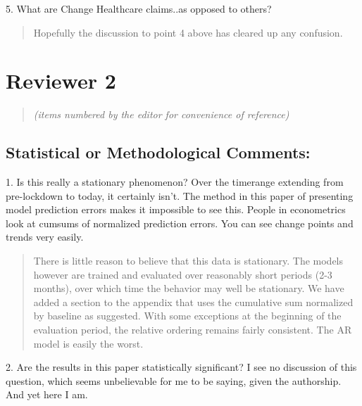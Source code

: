 \documentclass[11pt]{article}
\newenvironment{resp}{\begin{quote}\color{cobalt}}{\end{quote}}
\begin{document}
  5. What are Change Healthcare claims..as opposed to others?


\begin{resp}
  Hopefully the discussion to point 4 above has cleared up any confusion.
\end{resp}


\section*{Reviewer 2}
\begin{quote}
  \emph{(items numbered by the editor for convenience of reference)}
\end{quote}

\subsection*{Statistical or Methodological Comments:}
  
1. Is this really a stationary phenomenon? Over the timerange extending from
pre-lockdown to today, it certainly isn't. The method in this paper of
presenting model prediction errors makes it impossible to see this. People in
econometrics look at cumsums of normalized prediction errors. You can see change
points and trends very easily.

\begin{resp}
  There is little reason to believe that this data is stationary. The models
  however are trained and evaluated over reasonably short periods (2-3 months),
  over which time the behavior may well be stationary. We have added a section
  to the appendix that uses the cumulative sum normalized by baseline as
  suggested. With some exceptions at the beginning of 
  the evaluation period, the relative ordering remains fairly consistent. The AR
  model is easily the worst.

\end{resp}

2. Are the results in this paper statistically significant? I see no discussion
of this question, which seems unbelievable for me to be saying, given the
authorship. And yet here I am.
\end{document}
